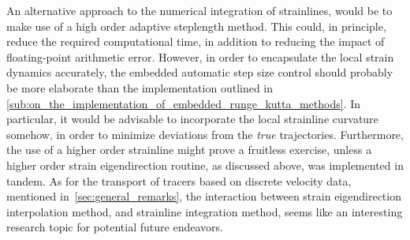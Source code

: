 An alternative approach to the numerical integration of strainlines, would be
to make use of a high order adaptive steplength method. This could, in
principle, reduce the required computational time, in addition to reducing
the impact of floating-point arithmetic error. However, in order to encapsulate
the local strain dynamics accurately, the embedded automatic step size control
should probably be more elaborate than the implementation outlined in
\cref{sub:on_the_implementation_of_embedded_runge_kutta_methods}. In particular,
it would be advisable to incorporate the local strainline curvature somehow,
in order to minimize deviations from the \emph{true} trajectories. Furthermore,
the use of a higher order strainline might prove a fruitless exercise, unless
a higher order strain eigendirection routine, as discussed above, was
implemented in tandem. As for the transport of tracers based on discrete
velocity data, mentioned in~\cref{sec:general_remarks}, the interaction
between strain eigendirection interpolation method, and strainline integration
method, seems like an interesting research topic for potential future endeavors.








